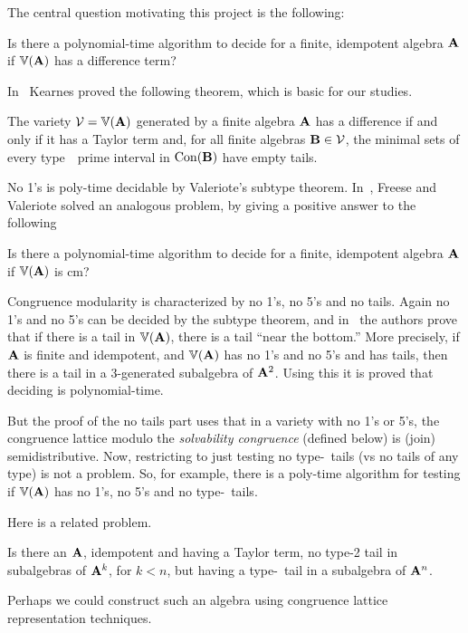 The central question motivating this project is the following:
\begin{prob}
  \label{prob:1}
  Is there a polynomial-time algorithm to decide for a finite,
  idempotent algebra $\mathbf{A}$ if $\operatorname{\mathbb{V}}(\mathbf{A})$ has a difference term?
\end{prob}
 
In~\cite{MR1358491} 
Kearnes proved the following theorem, which is basic for our studies.

\begin{theorem}\label{thm:KearnesThm}
The variety $\mathcal{V} = \operatorname{\mathbb{V}}(\mathbf{A})$ generated by a 
finite algebra $\mathbf{A}$ has a difference  if and only if
it has a Taylor term and, for all finite algebras 
$\mathbf{B} \in \mathcal{V}$,
the minimal sets of every type~\atyp\ prime interval in
$\operatorname{Con}(\mathbf{B})$ have empty tails.
\end{theorem}




No 1's is poly-time decidable by Valeriote's subtype theorem.
In~\cite{Freese:2009}, Freese and Valeriote solved an 
analogous problem, by giving a positive answer to the following
\begin{prob}
  \label{prob:2}
  Is there a polynomial-time algorithm to decide for a finite,
  idempotent algebra $\mathbf{A}$ if $\operatorname{\mathbb{V}}(\mathbf{A})$ is \ac{cm}?
\end{prob}

Congruence modularity is characterized by no 1's, no 5's and no tails.
Again no 1's and no 5's can be decided by the subtype theorem,
and in~\cite{Freese:2009} the authors prove that if there is
a tail in $\operatorname{\mathbb{V}}(\mathbf{A})$, there is a tail ``near the bottom.''
More precisely, if $\mathbf{A}$ is finite and idempotent, 
and $\operatorname{\mathbb{V}}(\mathbf{A})$ has no
1's and no 5's and has tails, then there is a tail in 
a 3-generated subalgebra of $\mathbf{A}^2$.
Using this it is proved that deciding \cm is polynomial-time.

But the proof of the no tails part uses that in a variety with 
no 1's or 5's, the congruence lattice modulo 
the {\it solvability congruence} (defined below)
is (join) semidistributive.
Now, restricting to just testing no type-\atyp\ tails 
(vs no tails of any type) is
not a problem. So, for example, there is a poly-time 
algorithm for testing if
$\operatorname{\mathbb{V}}(\mathbf{A})$ has no 1's, no 5's and no type-\atyp\ tails.  

Here is a related problem.
\begin{prob}
  \label{prob:3}
  Is there an $\mathbf{A}$, idempotent and having a Taylor term, 
  no type-2 tail in 
  subalgebras of $\mathbf{A}^k$, for $k < n$, but having a type-\atyp\ 
  tail in a subalgebra
  of $\mathbf{A}^n$. 
\end{prob}
Perhaps we could construct such an algebra using congruence lattice
representation techniques. 

